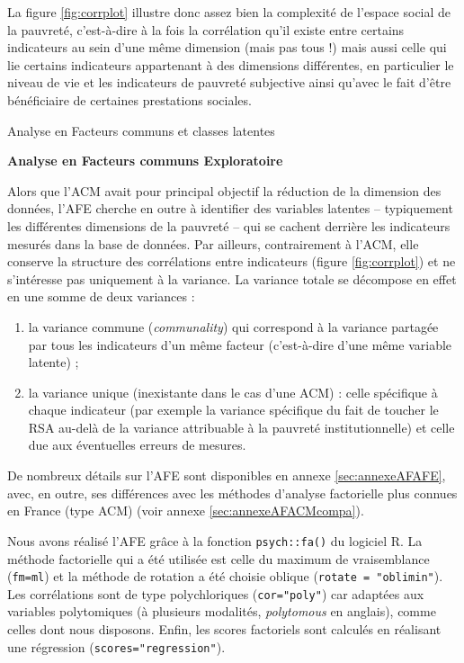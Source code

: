 \documentclass[12pt,a4paper]{reedthesis}
\begin{document}
La figure \ref{fig:corrplot} illustre donc assez bien la complexité de l'espace social de la pauvreté, c'est-à-dire à la fois la corrélation qu'il existe entre certains indicateurs au sein d'une même dimension (mais pas tous !) mais aussi celle qui lie certains indicateurs appartenant à des dimensions différentes, en particulier le niveau de vie et les indicateurs de pauvreté subjective ainsi qu'avec le fait d'être bénéficiaire de certaines prestations sociales.
\begin{summary_box}[false]{Analyse en Facteurs communs et classes latentes}

\textbf{Analyse en Facteurs communs Exploratoire}

Alors que l'ACM avait pour principal objectif la réduction de la dimension des données, l'AFE cherche en outre à identifier des variables latentes -- typiquement les différentes dimensions de la pauvreté -- qui se cachent derrière les indicateurs mesurés dans la base de données. Par ailleurs, contrairement à l'ACM, elle conserve la structure des corrélations entre indicateurs (figure \ref{fig:corrplot}) et ne s'intéresse pas uniquement à la variance. La variance totale se décompose en effet en une somme de deux variances :
\begin{enumerate}
\def\labelenumi{\arabic{enumi}.}
\item
  la variance commune (\emph{communality}) qui correspond à la variance partagée par tous les indicateurs d'un même facteur (c'est-à-dire d'une même variable latente) ;
\item
  la variance unique (inexistante dans le cas d'une ACM) : celle spécifique à chaque indicateur (par exemple la variance spécifique du fait de toucher le RSA au-delà de la variance attribuable à la pauvreté institutionnelle) et celle due aux éventuelles erreurs de mesures.
\end{enumerate}
De nombreux détails sur l'AFE sont disponibles en annexe \ref{sec:annexeAFAFE}, avec, en outre, ses différences avec les méthodes d'analyse factorielle plus connues en France (type ACM) (voir annexe \ref{sec:annexeAFACMcompa}).

Nous avons réalisé l'AFE grâce à la fonction \texttt{psych::fa()} du logiciel R. La méthode factorielle qui a été utilisée est celle du maximum de vraisemblance (\texttt{fm=ml}) et la méthode de rotation a été choisie oblique (\texttt{rotate\ =\ "oblimin"}). Les corrélations sont de type polychloriques (\texttt{cor="poly"}) car adaptées aux variables polytomiques (à plusieurs modalités, \emph{polytomous} en anglais), comme celles dont nous disposons. Enfin, les scores factoriels sont calculés en réalisant une régression (\texttt{scores="regression"}).


\end{summary_box}
\end{document}
